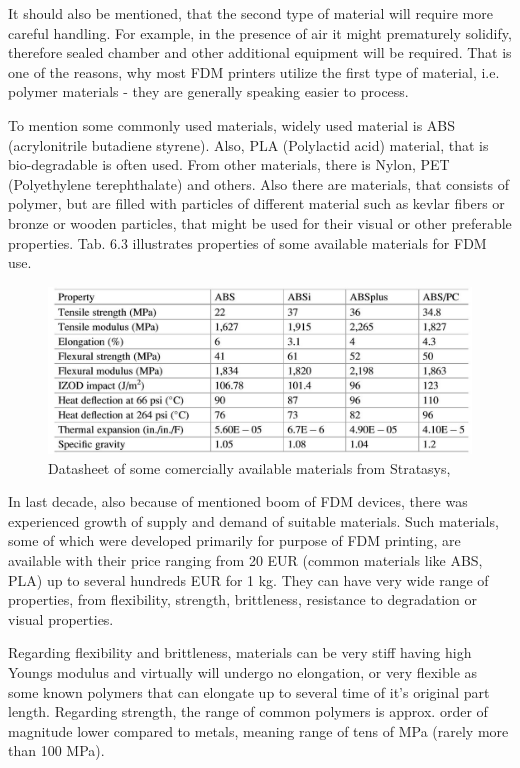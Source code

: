 \documentclass[a4paper, 11pt, reqno]{report}
\begin{document}
	It should also be mentioned, that the second type of material will require more careful handling. For example, in the presence of air it might prematurely solidify, therefore sealed chamber and other additional equipment will be required. That is one of the reasons, why most FDM printers utilize the first type of material, i.e. polymer materials - they are generally speaking easier to process.
	
	To mention some commonly used materials, widely used material is ABS (acrylonitrile butadiene styrene). Also, PLA (Polylactid acid) material, that is bio-degradable is often used. From other materials, there is Nylon, PET (Polyethylene terephthalate) and others. Also there are materials, that consists of polymer, but are filled with particles of different material such as kevlar fibers or bronze or wooden particles, that might be used for their visual or other preferable properties. Tab. 6.3 illustrates properties of some available materials for FDM use.
\begin{figure}[b]
	\centering
	\renewcommand\figurename{Tab.}
	\includegraphics[scale=0.7]{datasheetFDM}
	\caption{Datasheet of some comercially available materials from Stratasys, \cite[p. 163]{AMT}}
\end{figure}
	In last decade, also because of mentioned boom of FDM devices, there was experienced growth of supply and demand of suitable materials. Such materials, some of which were developed primarily for purpose of FDM printing, are available with their price ranging from 20 EUR (common materials like ABS, PLA) up to several hundreds EUR for 1 kg. They can have very wide range of properties, from flexibility, strength, brittleness, resistance to degradation or visual properties.
	
	Regarding flexibility and brittleness, materials can be very stiff having high Youngs modulus and virtually will undergo no elongation, or very flexible as some known polymers that can elongate up to several time of it's original part length. Regarding strength, the range of common polymers is approx. order of magnitude lower compared to metals, meaning range of tens of MPa (rarely more than 100 MPa).
\end{document}
